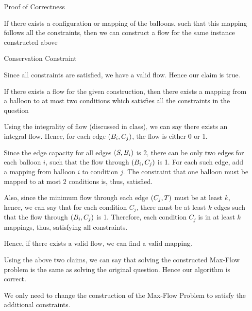 \documentclass{article}
\begin{document}
\begin{question}
\begin{qpart}{1}
\begin{qsection}{Proof of Correctness}
\begin{qproof}{If there exists a configuration or mapping of the balloons, such that this mapping follows all the constraints, then we can construct a flow for the same instance constructed above}
\begin{qsubsection}{Conservation Constraint}
				\end{qsubsection}

				Since all constraints are satisfied, we have a valid flow. Hence our claim is true.

			\end{qproof}

			\begin{qproof}{If there exists a flow for the given construction, then there exists a mapping from a balloon to at most two conditions which satisfies all the constraints in the question}

				Using the integrality of flow (discussed in class), we can say there exists an integral flow. Hence, for each edge $\left( B_i, C_j \right)$, the flow is either 0 or 1. \br%

				Since the edge capacity for all edges $\left( S, B_i \right)$ is 2, there can be only two edges for each balloon $i$, such that the flow through $\left( B_i, C_j \right)$ is 1. For each such edge, add a mapping from balloon $i$ to condition $j$. The constraint that one balloon must be mapped to at most 2 conditions is, thus, satisfied. \br%

				Also, since the minimum flow through each edge $\left( C_j, T \right)$ must be at least $k$, hence, we can say that for each condition $C_j$, there must be at least $k$ edges such that the flow through $\left( B_i, C_j \right)$ is 1. Therefore, each condition $C_j$ is in at least $k$ mappings, thus, satisfying all constraints. \br%

				Hence, if there exists a valid flow, we can find a valid mapping.

			\end{qproof}

			Using the above two claims, we can say that solving the constructed Max-Flow problem is the same as solving the original question. Hence our algorithm is correct.

		\end{qsection}

	\end{qpart}

	\begin{qpart}{2}

		We only need to change the construction of the Max-Flow Problem to satisfy the additional constraints.


\end{qpart}
\end{question}
\end{document}
